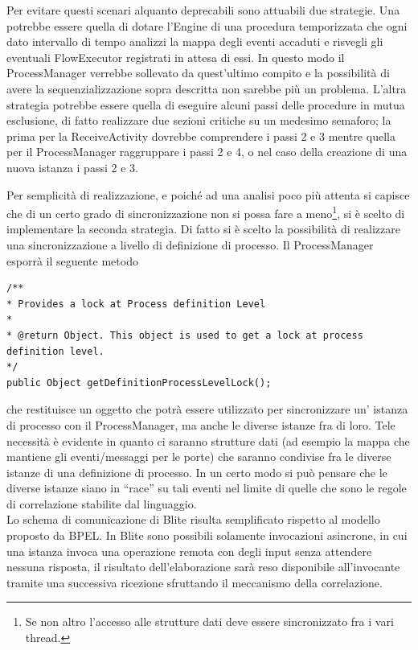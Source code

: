 Per evitare questi scenari alquanto deprecabili sono attuabili due strategie.
Una potrebbe essere quella di dotare l'Engine di una procedura temporizzata che
ogni dato intervallo di tempo analizzi la mappa degli eventi accaduti e risvegli
gli eventuali FlowExecutor registrati in attesa di essi. In questo modo il
ProcessManager verrebbe sollevato da quest'ultimo compito e la possibilità di
avere la sequenzializzazione sopra descritta non sarebbe più un problema.
L'altra strategia potrebbe essere quella di eseguire alcuni passi delle
procedure in mutua esclusione, di fatto realizzare due sezioni critiche su un
medesimo semaforo; la prima per la ReceiveActivity dovrebbe comprendere i passi
2 e 3 mentre quella per il ProcessManager raggruppare i passi 2 e 4, o nel caso
della creazione di una nuova istanza i passi 2 e 3.

Per semplicità di realizzazione, e poiché ad una analisi poco più attenta si
capisce che di un certo grado di sincronizzazione non si possa fare a meno\footnote{Se
non altro l'accesso alle strutture dati deve essere sincronizzato fra i vari
thread.}, si \`e scelto di implementare la seconda strategia. Di fatto si \`e
scelto la possibilità di realizzare una sincronizzazione a livello di
definizione di processo. Il ProcessManager esporrà il seguente metodo

\begin{lstlisting}
/**
* Provides a lock at Process definition Level
* 
* @return Object. This object is used to get a lock at process definition level.
*/
public Object getDefinitionProcessLevelLock();
\end{lstlisting}

che restituisce un oggetto che potrà essere utilizzato per sincronizzare un'
istanza di processo con il ProcessManager, ma anche le diverse istanze fra di
loro. Tele necessità \`e evidente in quanto ci saranno strutture dati (ad
esempio la mappa che mantiene gli eventi/messaggi per le porte) che saranno
condivise fra le diverse istanze di una definizione di processo. In un certo
modo si può pensare che le diverse istanze siano in ``race'' su tali eventi
nel limite di quelle che sono le regole di correlazione stabilite dal
linguaggio.
\\

Lo schema di comunicazione di Blite risulta semplificato rispetto al modello
proposto da BPEL. In Blite sono possibili solamente invocazioni asincrone, in
cui una istanza invoca una operazione remota con degli input senza attendere
nessuna risposta, il risultato dell'elaborazione sarà reso disponibile
all'invocante tramite una successiva ricezione sfruttando il meccanismo della
correlazione. 

